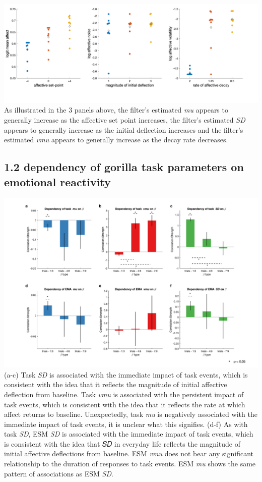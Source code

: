 \documentclass[
]{article}
\begin{document}
\includegraphics{./figures/figure_SimExpVsbayes.png} As illustrated in
the 3 panels above, the filter's estimated \emph{mu} appears to
generally increase as the affective set point increases, the filter's
estimated \emph{SD} appears to generally increase as the initial
deflection increases and the filter's estimated \emph{vmu} appears to
generally increase as the decay rate decreases.

\hypertarget{dependency-of-gorilla-task-parameters-on-emotional-reactivity}{%
\subsection{1.2 dependency of gorilla task parameters on emotional
reactivity}\label{dependency-of-gorilla-task-parameters-on-emotional-reactivity}}

\includegraphics{./figures/figure_Bayes_vs_Betas.png} (a-c) Task
\emph{SD} is associated with the immediate impact of task events, which
is consistent with the idea that it reflects the magnitude of initial
affective deflection from baseline. Task \emph{vmu} is associated with
the persistent impact of task events, which is consistent with the idea
that it reflects the rate at which affect returns to baseline.
Unexpectedly, task \emph{mu} is negatively associated with the immediate
impact of task events, it is unclear what this signifies. (d-f) As with
task \emph{SD}, ESM \emph{SD} is associated with the immediate impact of
task events, which is consistent with the idea that 𝑆𝐷 in everyday life
reflects the magnitude of initial affective deflections from baseline.
ESM \emph{vmu} does not bear any significant relationship to the
duration of responses to task events. ESM \emph{mu} shows the same
pattern of associations as ESM \emph{SD}.
\end{document}
